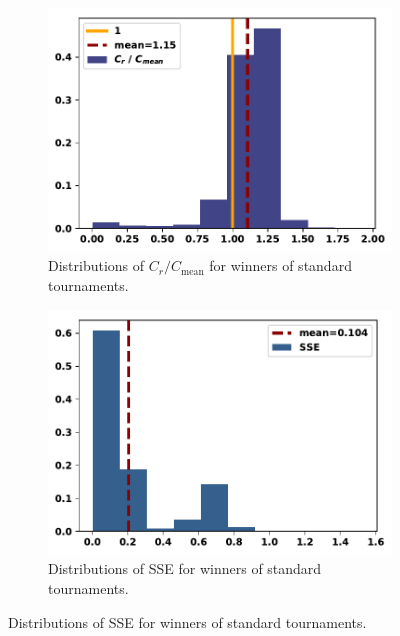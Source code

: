 \documentclass{article}
\begin{document}
\begin{figure}[!htbp]
    \centering
    \begin{subfigure}{0.35\textwidth}
        \centering
        \includegraphics[width=\textwidth]{../images/compared_to_mean_standard.pdf}
        \caption{Distributions of \(C_r / C_{\text{mean}}\) for winners of standard tournaments.}
    \end{subfigure}
    \begin{subfigure}{0.35\textwidth}
        \centering
        \includegraphics[width=\textwidth]{../images/sse_standard.pdf}
        \caption{Distributions of SSE for winners of standard tournaments.}
    \end{subfigure}
\end{figure}
\end{document}
